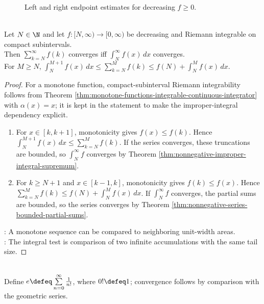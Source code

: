 \begin{figure}[H]
  \centering
  
  \caption{Left and right endpoint estimates for decreasing $f\geq0$.}
  \label{fig:integral-test-step-functions}
\end{figure}

\begin{theorem} \label{thm:integral-test-series} \\
Let $N\in\N$ and let $f:[N,\infty)\to[0,\infty)$ be decreasing and Riemann integrable on compact subintervals.\\
Then $\sum\limits_{k=N}^{\infty}f(k)$ converges iff $\int_N^\infty f(x)\,dx$ converges.\\
For $M\geq N$, $\int_N^{M+1} f(x)\,dx \leq \sum\limits_{k=N}^{M}f(k) \leq f(N)+\int_N^M f(x)\,dx$.
\begin{proof}
For a monotone function, compact-subinterval Riemann integrability follows from Theorem \ref{thm:monotone-functions-integrable-continuous-integrator} with $\alpha(x)=x$; it is kept in the statement to make the improper-integral dependency explicit.
\begin{enumerate}[label=\roman*.]
\setlength{\itemsep}{0pt}
\item[$(\Rightarrow)$] For $x\in[k,k+1]$, monotonicity gives $f(x)\leq f(k)$. Hence $\int_N^{M+1}f(x)\,dx\leq\sum_{k=N}^{M}f(k)$. If the series converges, these truncations are bounded, so $\int_N^\infty f$ converges by Theorem \ref{thm:nonnegative-improper-integral-supremum}.
\item[$(\Leftarrow)$] For $k\geq N+1$ and $x\in[k-1,k]$, monotonicity gives $f(k)\leq f(x)$. Hence $\sum_{k=N}^{M}f(k)\leq f(N)+\int_N^M f(x)\,dx$. If $\int_N^\infty f$ converges, the partial sums are bounded, so the series converges by Theorem \ref{thm:nonnegative-series-bounded-partial-sums}.
\end{enumerate}
: A monotone sequence can be compared to neighboring unit-width areas.\\
: The integral test is comparison of two infinite accumulations with the same tail size.
\end{proof}
\end{theorem}

\begin{definition} \label{def:number-e-by-series} \\
Define $e\defeq\sum\limits_{n=0}^{\infty}\frac{1}{n!}$, where $0!\defeq1$; convergence follows by comparison with the geometric series.
\end{definition}

